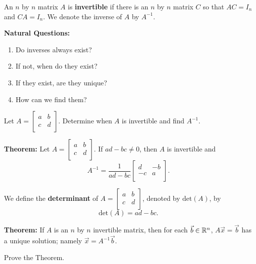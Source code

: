\documentclass[12pt,letterpaper]{article}
\begin{document}
\newpage

\begin{defn}
An $n$ by $n$ matrix $A$ is {\bf invertible} if there is an $n$ by $n$ matrix $C$ so that $AC=I_n$ and $CA=I_n$. We denote the inverse of $A$ by $A^{-1}$.
\end{defn}

{\bf Natural Questions:}
\begin{enumerate}
\item Do inverses always exist?
\item If not, when do they exist?
\item If they exist, are they unique?
\item How can we find them?
\end{enumerate}

\begin{enumerate}

\Problem Let $A=\begin{bmatrix} a & b\\ c & d\\ \end{bmatrix}$. Determine when $A$ is invertible and find $A^{-1}$. 

\newpage

{\bf Theorem:} Let $A=\begin{bmatrix} a & b \\ c & d\\ \end{bmatrix}$. If $ad-bc\neq 0$, then $A$ is invertible  and $$A^{-1}= \frac{1}{ad-bc} \begin{bmatrix} d & -b\\ -c &a \\ \end{bmatrix}.$$

\begin{defn}
We define the {\bf determinant} of $A=\begin{bmatrix} a & b \\ c & d\\ \end{bmatrix}$, denoted by $\text{det}(A)$, by $$\text{det}(A)=ad-bc.$$
\end{defn}

{\bf Theorem:} If $A$ is an $n$ by $n$ invertible matrix, then for each $\vec{b}\in \mathbb{R}^n$, $A\vec{x}=\vec{b}$ has a unique solution; namely $\vec{x}=A^{-1}\vec{b}$.

\Problem Prove the Theorem.

\vfill


\end{enumerate}
\end{document}
